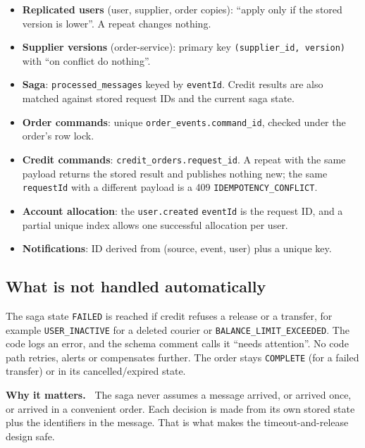 \documentclass[11pt,a4paper]{article}
\newcommand{\code}[1]{\nolinkurl{#1}}
\newenvironment{why}{%
  \def\FrameCommand{{\color{accent}\vrule width 2.5pt}\hspace{8pt}}%
  \MakeFramed{\advance\hsize-\width\FrameRestore}\noindent\textbf{Why it matters.\ }}%
  {\endMakeFramed}
\begin{document}
\begin{itemize}
  \item \textbf{Replicated users} (user, supplier, order copies): ``apply only if the
  stored version is lower''. A repeat changes nothing.
  \item \textbf{Supplier versions} (order-service): primary key
  \code{(supplier_id, version)} with ``on conflict do nothing''.
  \item \textbf{Saga}: \code{processed_messages} keyed by \code{eventId}. Credit results
  are also matched against stored request IDs and the current saga state.
  \item \textbf{Order commands}: unique \code{order_events.command_id}, checked under the
  order's row lock.
  \item \textbf{Credit commands}: \code{credit_orders.request_id}. A repeat with the
  same payload returns the stored result and publishes nothing new; the same
  \code{requestId} with a different payload is a 409 \code{IDEMPOTENCY_CONFLICT}.
  \item \textbf{Account allocation}: the \code{user.created} \code{eventId} is the
  request ID, and a partial unique index allows one successful allocation per user.
  \item \textbf{Notifications}: ID derived from (source, event, user) plus a unique key.
\end{itemize}

\subsection{What is not handled automatically}

The saga state \code{FAILED} is reached if credit refuses a release or a transfer, for
example \code{USER_INACTIVE} for a deleted courier or \code{BALANCE_LIMIT_EXCEEDED}. The
code logs an error, and the schema comment calls it ``needs attention''. No code path
retries, alerts or compensates further. The order stays \code{COMPLETE} (for a failed
transfer) or in its cancelled/expired state.

\begin{why}
The saga never assumes a message arrived, or arrived once, or arrived in a convenient
order. Each decision is made from its own stored state plus the identifiers in the
message. That is what makes the timeout-and-release design safe.
\end{why}

\end{document}
